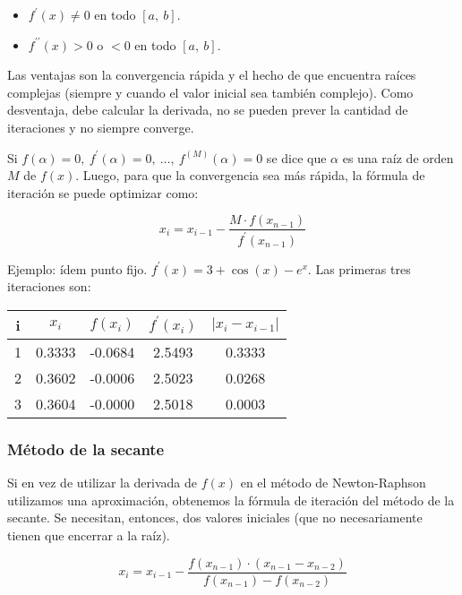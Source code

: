 \documentclass{article}
\begin{document}
\begin{itemize}
    \item $f^\prime(x)\neq0$ en todo $[a,\ b]$.
    \item $f^{\prime\prime}(x)>0$ o $<0$ en todo $[a,\ b]$.
\end{itemize}

Las ventajas son la convergencia rápida y el hecho de que encuentra raíces 
complejas (siempre y cuando el valor inicial sea también complejo). Como 
desventaja, debe calcular la derivada, no se pueden prever la cantidad de 
iteraciones y no siempre converge.

Si $f(\alpha)=0,\ f^\prime(\alpha) = 0,\ \dots,\ f^{(M)}(\alpha) = 0$ se dice 
que $\alpha$ es una raíz de orden $M$ de $f(x)$. Luego, para que la convergencia
sea más rápida, la fórmula de iteración se puede optimizar como:

\begin{equation*}
    x_i = x_{i-1} - \frac{M\cdot f(x_{n-1})}{f^\prime(x_{n-1})}
\end{equation*}

Ejemplo: ídem punto fijo. $f^\prime(x) = 3 + \cos(x) - e^x$. Las primeras tres
iteraciones son:

\begin{table}[h]
\centering
\begin{tabular}{ccccc}
    i & $x_i$  & $f(x_i)$ & $f^\prime(x_i)$ & $|x_i - x_{i-1}|$ \\\hline
    1 & 0.3333 & -0.0684  & 2.5493          & 0.3333            \\
    2 & 0.3602 & -0.0006  & 2.5023          & 0.0268            \\
    3 & 0.3604 & -0.0000  & 2.5018          & 0.0003            \\
\end{tabular}
\end{table}

\subsubsection{Método de la secante}

Si en vez de utilizar la derivada de $f(x)$ en el método de Newton-Raphson 
utilizamos una aproximación, obtenemos la fórmula de iteración del método de 
la secante. Se necesitan, entonces, dos valores iniciales (que no necesariamente
tienen que encerrar a la raíz).

\begin{equation*}
    x_i = x_{i-1} - \frac{f(x_{n-1})\cdot(x_{n-1}-x_{n-2})}{f(x_{n-1})-f(x_{n-2})}
\end{equation*}
\end{document}
